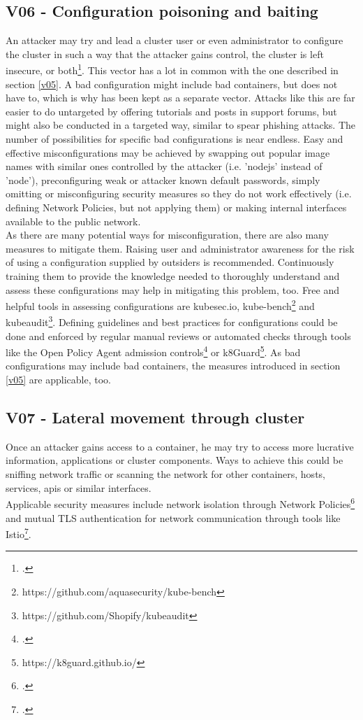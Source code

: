 \subsection{V06 - Configuration poisoning and baiting}
An attacker may try and lead a cluster user or even administrator to configure the cluster in such a way that the attacker gains control, the cluster is left insecure, or both\footcite[][, p. 13 to 14]{nistK8s}.
This vector has a lot in common with the one described in section \ref{v05}. A bad configuration might include bad containers, but does not have to, which is why has been kept as a separate vector. Attacks like this are far easier to do untargeted by offering tutorials and posts in support forums, but might also be conducted in a targeted way, similar to spear phishing attacks.
The number of possibilities for specific bad configurations is near endless. Easy and effective misconfigurations may be achieved by swapping out popular image names with similar ones controlled by the attacker (i.e. 'nodejs' instead of 'node'), preconfiguring weak or attacker known default passwords, simply omitting or misconfiguring security measures so they do not work effectively (i.e. defining Network Policies, but not applying them) or making internal interfaces available to the public network. \\
\newpage
As there are many potential ways for misconfiguration, there are also many measures to mitigate them.
Raising user and administrator awareness for the risk of using a configuration supplied by outsiders is recommended. Continuously training them to provide the knowledge needed to thoroughly understand and assess these configurations may help in mitigating this problem, too. 
Free and helpful tools in assessing configurations are kubesec.io, kube-bench\footnote{https://github.com/aquasecurity/kube-bench} and kubeaudit\footnote{https://github.com/Shopify/kubeaudit}.
Defining guidelines and best practices for configurations could be done and enforced by regular manual reviews or automated checks through tools like the Open Policy Agent admission controls\footcite[][, section 'Wrap Up']{opaAdmission} or k8Guard\footnote{https://k8guard.github.io/}.
As bad configurations may include bad containers, the measures introduced in section \ref{v05} are applicable, too.

\subsection{V07 - Lateral movement through cluster} \label{v07}
Once an attacker gains access to a container, he may try to access more lucrative information, applications or cluster components. Ways to achieve this could be sniffing network traffic or scanning the network for other containers, hosts, services, apis or similar interfaces. \\
Applicable security measures include network isolation through Network Policies\footcite[][, section 'The NetworkPolicy Resource']{netPols} and mutual TLS authentication for network communication through tools like Istio\footcite[][, section 'Mutual TLS authentication']{istioMtls}.

